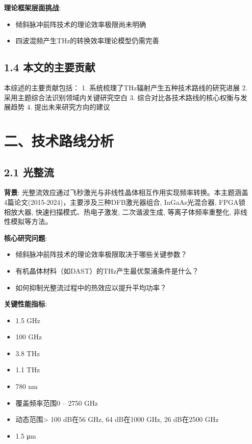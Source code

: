 \documentclass[12pt]{article}
\begin{document}
\textbf{理论框架层面挑战}:
\begin{itemize}
\item 倾斜脉冲前阵技术的理论效率极限尚未明确
\item 四波混频产生THz的转换效率理论模型仍需完善
\end{itemize}


\subsection{1.4 本文的主要贡献}

本综述的主要贡献包括：
1. 系统梳理了THz辐射产生五种技术路线的研究进展
2. 采用主题综合法识别领域内关键研究空白
3. 综合对比各技术路线的核心权衡与发展趋势
4. 提出未来研究方向的建议


\section{二、技术路线分析}


\subsection{2.1 光整流}

\textbf{背景}: 光整流效应通过飞秒激光与非线性晶体相互作用实现频率转换。本主题涵盖4篇论文(2015-2024)，主要涉及三种DFB激光器组合, InGaAs光混合器, FPGA锁相放大器, 快速扫描模式、热电子激发, 二次谐波生成, 等离子体频率重整化, 非线性模拟等方法。

\textbf{核心研究问题}:
\begin{itemize}
\item 倾斜脉冲前阵技术的理论效率极限取决于哪些关键参数？
\item 有机晶体材料（如DAST）的THz产生最优泵浦条件是什么？
\item 如何抑制光整流过程中的热效应以提升平均功率？
\end{itemize}

\textbf{关键性能指标}:
\begin{itemize}
\item 1.5 GHz
\item 100 GHz
\item 3.8 THz
\item 1.1 THz
\item 780 nm
\item 覆盖频率范围0 – 2750 GHz
\item 动态范围> 100 dB在56 GHz, 64 dB在1000 GHz, 26 dB在2500 GHz
\item 1.5 μm
\end{itemize}
\end{document}
